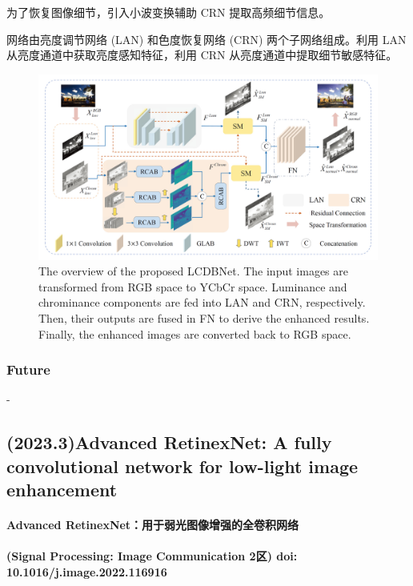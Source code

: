 \documentclass[letterpaper,10pt]{article}
\begin{document}
			为了恢复图像细节，引入小波变换辅助 CRN 提取高频细节信息。
			
			网络由亮度调节网络 (LAN) 和色度恢复网络 (CRN) 两个子网络组成。利用 LAN 从亮度通道中获取亮度感知特征，利用 CRN 从亮度通道中提取细节敏感特征。
			
			\begin{figure}[htbp]
				\centering 
				\includegraphics[width=\columnwidth]{picture/LLIE/LCDBNet}
				\caption{
					\label{fig: LCDBNet} 
					The overview of the proposed LCDBNet. The input images are transformed from RGB space to YCbCr space. Luminance and
					chrominance components are fed into LAN and CRN, respectively. Then, their outputs are fused in FN to derive the enhanced results.
					Finally, the enhanced images are converted back to RGB space.
				}
			\end{figure}
			
			\subsubsection{Future}
		
			-
			
		\subsection{(2023.3)Advanced RetinexNet: A fully convolutional network for low-light image enhancement}
			
		\paragraph{Advanced RetinexNet：用于弱光图像增强的全卷积网络}
			
		\paragraph{(Signal Processing: Image Communication 2区) doi: 10.1016/j.image.2022.116916}
			
\end{document}
